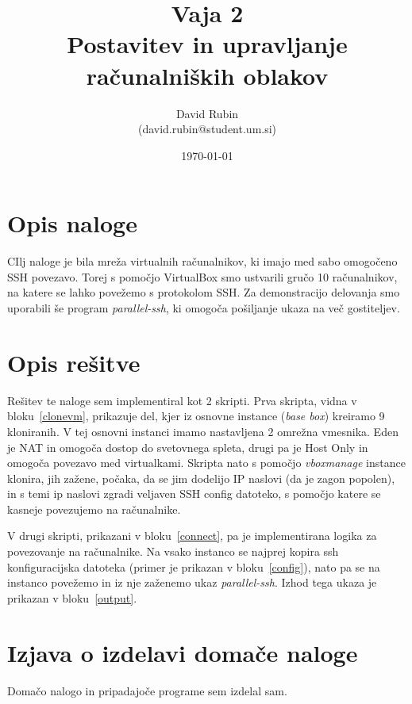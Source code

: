 \documentclass[a4paper,11pt]{article}
\title{%
  Vaja 2\\
  \large Postavitev in upravljanje računalniških oblakov}
\author{David Rubin \\ (david.rubin@student.um.si)}
\date{\today}
\begin{document}
\maketitle

\section{Opis naloge}

CIlj naloge je bila mreža virtualnih računalnikov, ki imajo med sabo omogočeno SSH povezavo. Torej s pomočjo VirtualBox smo ustvarili gručo 10 računalnikov, na katere se lahko povežemo s protokolom SSH. Za demonstracijo delovanja smo uporabili še program \textit{parallel-ssh}, ki omogoča pošiljanje ukaza na več gostiteljev.

\section{Opis rešitve}

Rešitev te naloge sem implementiral kot 2 skripti. Prva skripta, vidna v bloku~\ref{clonevm}, prikazuje del, kjer iz osnovne instance (\textit{base box}) kreiramo 9 kloniranih. V tej osnovni instanci imamo nastavljena 2 omrežna vmesnika. Eden je NAT in omogoča dostop do svetovnega spleta, drugi pa je Host Only in omogoča povezavo med virtualkami. Skripta nato s pomočjo \textit{vboxmanage} instance klonira, jih zažene, počaka, da se jim dodelijo IP naslovi (da je zagon popolen), in s temi ip naslovi zgradi veljaven SSH config datoteko, s pomočjo katere se kasneje povezujemo na računalnike.

V drugi skripti, prikazani v bloku~\ref{connect}, pa je implementirana logika za povezovanje na računalnike. Na vsako instanco se najprej kopira ssh konfiguracijska datoteka (primer je prikazan v bloku~\ref{config}), nato pa se na instanco povežemo in iz nje zaženemo ukaz \textit{parallel-ssh}. Izhod tega ukaza je prikazan v bloku~\ref{output}.











\section{Izjava o izdelavi domače naloge}
Domačo nalogo in pripadajoče programe sem izdelal sam.
\end{document}
